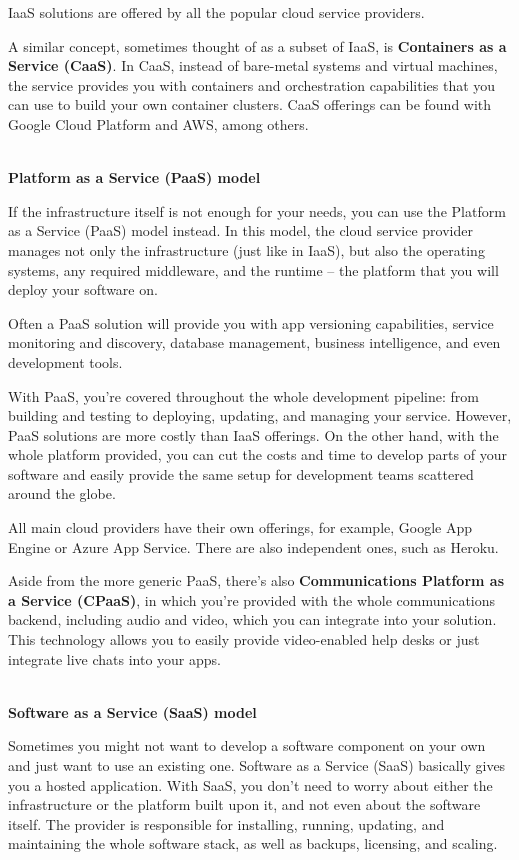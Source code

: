 IaaS solutions are offered by all the popular cloud service providers.

A similar concept, sometimes thought of as a subset of IaaS, is \textbf{Containers as a Service (CaaS)}. In CaaS, instead of bare-metal systems and virtual machines, the service provides you with containers and orchestration capabilities that you can use to build your own container clusters. CaaS offerings can be found with Google Cloud Platform and AWS, among others.


\hspace*{\fill} \\ %
\noindent
\textbf{Platform as a Service (PaaS) model}

If the infrastructure itself is not enough for your needs, you can use the Platform as a Service (PaaS) model instead. In this model, the cloud service provider manages not only the infrastructure (just like in IaaS), but also the operating systems, any required middleware, and the runtime – the platform that you will deploy your software on.

Often a PaaS solution will provide you with app versioning capabilities, service monitoring and discovery, database management, business intelligence, and even development tools.

With PaaS, you're covered throughout the whole development pipeline: from building and testing to deploying, updating, and managing your service. However, PaaS solutions are more costly than IaaS offerings. On the other hand, with the whole platform provided, you can cut the costs and time to develop parts of your software and easily provide the same setup for development teams scattered around the globe.

All main cloud providers have their own offerings, for example, Google App Engine or Azure App Service. There are also independent ones, such as Heroku.

Aside from the more generic PaaS, there's also \textbf{Communications Platform as a Service (CPaaS)}, in which you're provided with the whole communications backend, including audio and video, which you can integrate into your solution. This technology allows you to easily provide video-enabled help desks or just integrate live chats into your apps.


\hspace*{\fill} \\ %
\noindent
\textbf{Software as a Service (SaaS) model}

Sometimes you might not want to develop a software component on your own and just want to use an existing one. Software as a Service (SaaS) basically gives you a hosted application. With SaaS, you don't need to worry about either the infrastructure or the platform built upon it, and not even about the software itself. The provider is responsible for installing, running, updating, and maintaining the whole software stack, as well as backups, licensing, and scaling.

